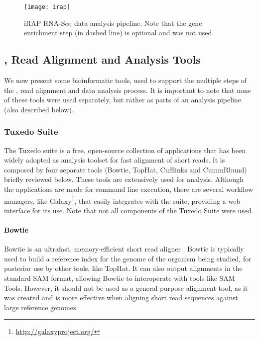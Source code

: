 \begin{figure}[!htb]
  \begin{center}
    \leavevmode
    \texttt{[image: irap]}
    \caption[iRAP RNA-Seq data analysis pipeline]{
      iRAP RNA-Seq data analysis pipeline. Note that the gene enrichment step
      (in dashed line) is optional and was not used.
    }
    \label{fig:irap}
  \end{center}
\end{figure}

\subsection{\rnaseq{}, Read Alignment and Analysis Tools}\label{sec:seqtools}

We now present some bioinformatic tools, used to support the multiple steps of
the \rnaseq{}, read alignment and data analysis process. It is important to note
that none of these tools were used separately, but rather as parts of an
analysis pipeline (also described below).

\subsubsection*{Tuxedo Suite}

The Tuxedo suite is a free, open-source collection of applications that has been
widely adopted as analysis toolset for fast alignment of short reads. It is
composed by four separate tools (Bowtie, TopHat, Cufflinks and CummRbund)
briefly reviewed below. These tools are extensively used for \rnaseq{} analysis.
Although the applications are made for command line execution, there are several
workflow managers, like Galaxy\footnote{\url{http://galaxyproject.org/}}, that
easily integrates with the suite, providing a web interface for its use. Note
that not all components of the Tuxedo Suite were used.

\paragraph{Bowtie}

Bowtie is an ultrafast, memory-efficient short read aligner
\cite{langmead2009ultrafast}. Bowtie is typically used to build a reference
index for the genome of the organism being studied, for posterior use by other
tools, like TopHat. It can also output alignments in the standard SAM format,
allowing Bowtie to interoperate with tools like SAM Tools. However, it should
not be used as a general purpose alignment tool, as it was created and is more
effective when aligning short read sequences against large reference genomes.

